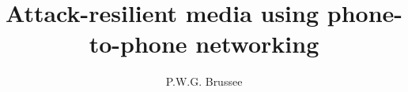\documentclass[whitelogo]{tudelft-report}
\begin{document}
\frontmatter

\title[tudelft-white]{Attack-resilient media using phone-to-phone networking}
\author[tudelft-black]{P.W.G. Brussee}

%

\makecover[split]



%
%

\tableofcontents

\mainmatter

%










\appendix

%


	
\end{document}
